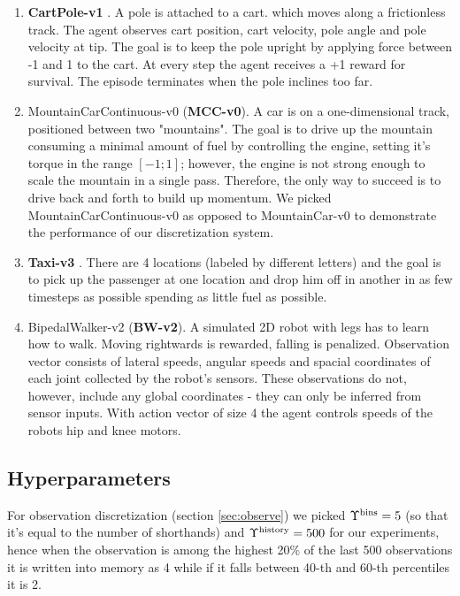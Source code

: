 \begin{enumerate}
\item \textbf{CartPole-v1} \cite{bartoNeuronlikeAdaptiveElements1983}.
A pole is attached to a cart.  which moves along a frictionless track.
The agent observes cart position, cart velocity, pole angle and pole velocity at tip.
The goal is to keep the pole upright by applying force between -1 and 1 to the cart.
At every step the agent receives a +1 reward for survival.
The episode terminates when the pole inclines too far.
\item MountainCarContinuous-v0 (\textbf{MCC-v0})\cite{mooreEfficientMemorybasedLearning1990}.
A car is on a one-dimensional track, positioned between two "mountains". 
The goal is to drive up the mountain consuming a minimal amount of fuel by controlling the engine, setting it's torque in the range $[-1;1]$; however, the engine is not strong enough to scale the mountain in a single pass.
Therefore, the only way to succeed is to drive back and forth to build up momentum. 
We picked MountainCarContinuous-v0 as opposed to MountainCar-v0 to demonstrate the performance of our discretization system.
\item \textbf{Taxi-v3} \cite{dietterichHierarchicalReinforcementLearning2000}. There are 4 locations (labeled by different letters) and the goal is to pick up the passenger at one location and drop him off in another in as few timesteps as possible spending as little fuel as possible.
\item BipedalWalker-v2 (\textbf{BW-v2}). A simulated 2D robot with legs has to learn how to walk. 
Moving rightwards is rewarded, falling is penalized.
Observation vector consists of lateral speeds, angular speeds and spacial coordinates of each joint collected by the robot's sensors.
These observations do not, however, include any global coordinates - they can only be inferred from sensor inputs.
With action vector of size 4 the agent controls speeds of the robots hip and knee motors.
\end{enumerate}

\subsection{Hyperparameters}

For observation discretization (section \ref{sec:observe}) we picked $\Upsilon^\text{bins}=5$ (so that it's equal to the number of shorthands) and $\Upsilon^\text{history}=500$ for our experiments, hence when the observation is among the highest 20\% of the last 500 observations it is written into memory as 4 while if it falls between 40-th and 60-th percentiles it is 2.


